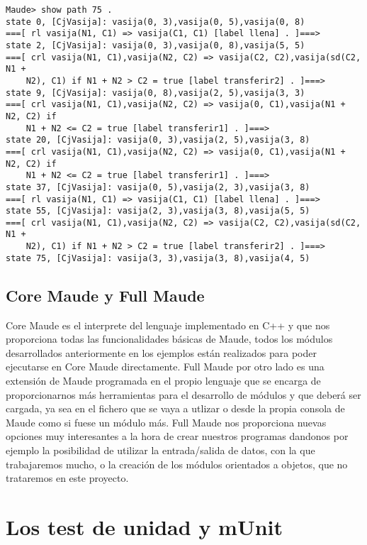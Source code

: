 {\codesize
\begin{verbatim}
Maude> show path 75 .
state 0, [CjVasija]: vasija(0, 3),vasija(0, 5),vasija(0, 8)
===[ rl vasija(N1, C1) => vasija(C1, C1) [label llena] . ]===>
state 2, [CjVasija]: vasija(0, 3),vasija(0, 8),vasija(5, 5)
===[ crl vasija(N1, C1),vasija(N2, C2) => vasija(C2, C2),vasija(sd(C2, N1 +
    N2), C1) if N1 + N2 > C2 = true [label transferir2] . ]===>
state 9, [CjVasija]: vasija(0, 8),vasija(2, 5),vasija(3, 3)
===[ crl vasija(N1, C1),vasija(N2, C2) => vasija(0, C1),vasija(N1 + N2, C2) if
    N1 + N2 <= C2 = true [label transferir1] . ]===>
state 20, [CjVasija]: vasija(0, 3),vasija(2, 5),vasija(3, 8)
===[ crl vasija(N1, C1),vasija(N2, C2) => vasija(0, C1),vasija(N1 + N2, C2) if
    N1 + N2 <= C2 = true [label transferir1] . ]===>
state 37, [CjVasija]: vasija(0, 5),vasija(2, 3),vasija(3, 8)
===[ rl vasija(N1, C1) => vasija(C1, C1) [label llena] . ]===>
state 55, [CjVasija]: vasija(2, 3),vasija(3, 8),vasija(5, 5)
===[ crl vasija(N1, C1),vasija(N2, C2) => vasija(C2, C2),vasija(sd(C2, N1 +
    N2), C1) if N1 + N2 > C2 = true [label transferir2] . ]===>
state 75, [CjVasija]: vasija(3, 3),vasija(3, 8),vasija(4, 5)
\end{verbatim}
}

\subsection{Core Maude y Full Maude}

Core Maude es el interprete del lenguaje implementado en C++ y que nos proporciona todas las funcionalidades básicas de Maude, todos los módulos desarrollados anteriormente en los ejemplos están realizados para poder ejecutarse en Core Maude directamente. Full Maude por otro lado es una extensión de Maude programada en el propio lenguaje que se encarga de proporcionarnos más herramientas para el desarrollo de módulos y que deberá ser cargada, ya sea en el fichero que se vaya a utlizar o desde la propia consola de Maude como si fuese un módulo más. Full Maude nos proporciona nuevas opciones muy interesantes a la hora de crear nuestros programas dandonos por ejemplo la posibilidad de utilizar la entrada/salida de datos, con la que trabajaremos mucho, o la creación de los módulos orientados a objetos, que no trataremos en este proyecto.\par 

\section{Los test de unidad y mUnit}

